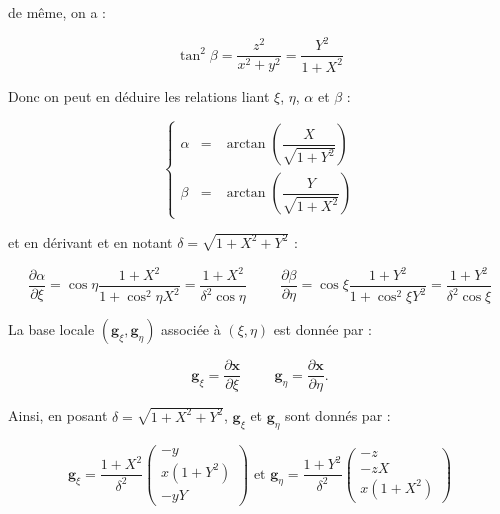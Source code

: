 de même, on a :

\begin{equation}
\tan^2 \beta = \dfrac{z^2}{x^2+y^2} = \dfrac{Y^2}{1+X^2}
\end{equation}

Donc on peut en déduire les relations liant $\xi$, $\eta$, $\alpha$ et $\beta$ :

\begin{equation}
\left\lbrace
\begin{array}{rcl}
\alpha & = & \arctan \left( \dfrac{X}{\sqrt{1+Y^2}} \right)\\
\beta & = & \arctan \left( \dfrac{Y}{\sqrt{1+X^2}} \right)
\end{array}
\right.
\label{eq: alpha(xi) beta(eta)}
\end{equation}

et en dérivant et en notant $\delta=\sqrt{1+X^2+Y^2}$ :

\begin{equation}
\dfrac{\partial \alpha}{\partial \xi} = \cos \eta \dfrac{1+X^2}{1+\cos^2 \eta X^2} = \dfrac{1+X^2}{ \delta^2 \cos \eta}\hspace{1cm} \dfrac{\partial \beta}{\partial \eta} = \cos \xi \dfrac{1+Y^2}{1+\cos^2 \xi Y^2}= \dfrac{1+Y^2}{ \delta^2 \cos \xi }
\label{eq; der alpha beta}
\end{equation}

La base locale $(\mathbf{g}_{\xi}, \mathbf{g}_{\eta})$ associée à $(\xi,\eta)$ est donnée par :

$$\mathbf{g}_{\xi} = \dfrac{\partial \mathbf{x}}{\partial \xi} \hspace{1cm} \mathbf{g}_{\eta} = \dfrac{\partial \mathbf{x}}{\partial \eta}.$$

Ainsi, en posant $\delta = \sqrt{1+X^2+Y^2}$, $\mathbf{g}_{\xi}$ et $\mathbf{g}_{\eta}$ sont donnés par :

\begin{equation}
\mathbf{g}_{\xi} = \dfrac{1+X^2}{\delta^2} \begin{pmatrix}
-y \\ x(1+Y^2) \\ -yY
\end{pmatrix} \text{ et } \mathbf{g}_{\eta} = \dfrac{1+Y^2}{\delta^2} \begin{pmatrix}
-z \\ -zX \\ x(1+X^2)
\end{pmatrix}
\label{eq: base locale I}
\end{equation}


